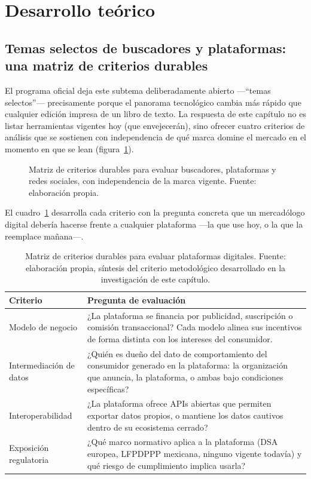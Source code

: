 \section{Desarrollo teórico}

\subsection{Temas selectos de buscadores y plataformas: una matriz de criterios durables}

El programa oficial deja este subtema deliberadamente abierto
—\enquote{temas selectos}— precisamente porque el panorama tecnológico cambia
más rápido que cualquier edición impresa de un libro de texto. La respuesta
de este capítulo no es listar herramientas vigentes hoy (que envejecerán),
sino ofrecer cuatro criterios de análisis que se sostienen con independencia
de qué marca domine el mercado en el momento en que se lean
(figura~\ref{fig:cap04-criterios}).

\begin{figure}[htbp]
  \centering
  
  \caption{Matriz de criterios durables para evaluar buscadores, plataformas
  y redes sociales, con independencia de la marca vigente. Fuente:
  elaboración propia.}
  \label{fig:cap04-criterios}
\end{figure}

El cuadro~\ref{tab:cap04-criterios} desarrolla cada criterio con la pregunta
concreta que un mercadólogo digital debería hacerse frente a cualquier
plataforma —la que use hoy, o la que la reemplace mañana—.

\begin{table}[htbp]
\centering
\begin{tabular}{@{}p{3.3cm}p{9.1cm}@{}}
\toprule
Criterio & Pregunta de evaluación \\
\midrule
Modelo de negocio & ¿La plataforma se financia por publicidad, suscripción o comisión transaccional? Cada modelo alinea sus incentivos de forma distinta con los intereses del consumidor. \\
Intermediación de datos & ¿Quién es dueño del dato de comportamiento del consumidor generado en la plataforma: la organización que anuncia, la plataforma, o ambas bajo condiciones específicas? \\
Interoperabilidad & ¿La plataforma ofrece APIs abiertas que permiten exportar datos propios, o mantiene los datos cautivos dentro de su ecosistema cerrado? \\
Exposición regulatoria & ¿Qué marco normativo aplica a la plataforma (DSA europea, LFPDPPP mexicana, ninguno vigente todavía) y qué riesgo de cumplimiento implica usarla? \\
\bottomrule
\end{tabular}
\caption{Matriz de criterios durables para evaluar plataformas digitales.
Fuente: elaboración propia, síntesis del criterio metodológico desarrollado
en la investigación de este capítulo.}
\label{tab:cap04-criterios}
\end{table}

